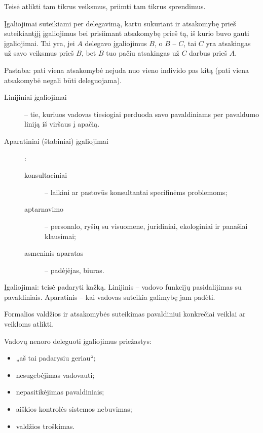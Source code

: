\begin{defn}[Įgaliojimai]
  Teisė atlikti tam tikrus veiksmus, priimti tam tikrus sprendimus.

  Įgaliojimai suteikiami per delegavimą, kartu sukuriant ir
  atsakomybę prieš suteikiantįjį įgaliojimus bei prisiimant atsakomybę
  prieš tą, iš kurio buvo gauti įgaliojimai. Tai yra, jei $A$
  delegavo įgaliojimus $B$, o $B$ – $C$, tai $C$ yra atsakingas už
  savo veiksmus prieš $B$, bet $B$ tuo pačiu atsakingas už $C$ darbus
  prieš $A$.

  Pastaba: pati viena atsakomybė nejuda nuo vieno individo pas kitą
  (pati viena atsakomybė negali būti deleguojama).

  \begin{description}
    \item[Linijiniai įgaliojimai] – tie, kuriuos vadovas tiesiogiai
      perduoda savo pavaldiniams per pavaldumo liniją iš viršaus į
      apačią.
    \item[Aparatiniai (štabiniai) įgaliojimai]:
      \begin{description}
        \item[konsultaciniai] – laikini ar pastovūs konsultantai
          specifinėms problemoms;
        \item[aptarnavimo] – personalo, ryšių su visuomene, juridiniai,
          ekologiniai ir panašiai klausimai;
        \item[asmeninis aparatas] – padėjėjas, biuras.
      \end{description}
  \end{description}
\end{defn}

Įgaliojimai: teisė padaryti kažką. Linijinis – vadovo funkcijų 
pasidalijimas su pavaldiniais. Aparatinis – kai vadovas suteikia
galimybę jam padėti.

\begin{defn}[Delegavimas]
  Formalios valdžios ir atsakomybės suteikimas pavaldiniui konkrečiai
  veiklai ar veikloms atlikti.
\end{defn}

Vadovų nenoro deleguoti įgaliojimus priežastys:
\begin{itemize}
  \item „aš tai padarysiu geriau“;
  \item nesugebėjimas vadovauti;
  \item nepasitikėjimas pavaldiniais;
  \item aiškios kontrolės sistemos nebuvimas;
  \item valdžios troškimas.
\end{itemize}

